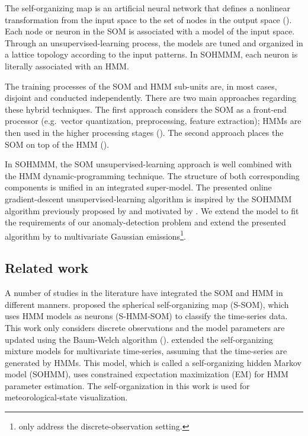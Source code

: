The self-organizing map is an artificial neural network that defines a nonlinear transformation from the input space to the set of nodes in the output space (\citet{Somervuo2000}). Each node or neuron in the SOM is associated with a model of the input space. Through an unsupervised-learning process, the models are tuned and organized in a lattice topology according to the input patterns. In SOHMMM, each neuron is literally associated with an HMM.  

The training processes of the SOM and HMM sub-units are, in most cases, disjoint and conducted independently. There are two main approaches regarding these hybrid techniques. The first approach considers the SOM as a front-end processor (e.g.\ vector quantization, preprocessing, feature extraction); HMMs are then used in the higher processing stages (\citet{Somervuo2000,Kurimo1996,Morimoto2016}). The second approach places the SOM on top of the HMM (\citet{Ferles2013,Ferles2013b,Lebbah2015}).   

In SOHMMM, the SOM unsupervised-learning approach is well combined with the HMM dynamic-programming technique. The structure of both corresponding components is unified in an integrated super-model. The presented online gradient-descent unsupervised-learning algorithm is inspired by the SOHMMM algorithm previously proposed by \citet{Ferles2013} and motivated by \citet{Baldi1994}. We extend the model to fit the requirements of our anomaly-detection problem and extend the presented algorithm by \citet{Ferles2013} to multivariate Gaussian emissions\footnote{\citet{Ferles2013} only address the discrete-observation setting.}.

\subsection{Related work}
A number of studies in the literature have integrated the SOM and HMM in different manners. \citet{Gen2012} proposed the spherical self-organizing map (S-SOM), which uses HMM models as neurons (S-HMM-SOM) to classify the time-series data. This work only considers discrete observations and the model parameters are updated using the Baum-Welch algorithm (\citet{Baum1972}). \citet{Yamaguchi2010} extended the self-organizing mixture models for multivariate time-series, assuming that the time-series are generated by HMMs. This model, which is called a self-organizing hidden Markov model (SOHMM), uses constrained expectation maximization (EM) for HMM parameter estimation. The self-organization in this work is used for meteorological-state visualization. 

